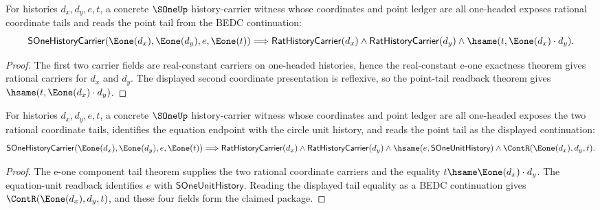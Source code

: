 \begin{theorem}
\label{thm:sone-history-carrier-e1-components-tail}
For histories $d_x,d_y,e,t$, a concrete $\SOneUp$ history-carrier witness whose
coordinates and point ledger are all one-headed exposes rational coordinate
tails and reads the point tail from the BEDC continuation:
$$
\mathsf{SOneHistoryCarrier}(\Eone(d_x),\Eone(d_y),e,\Eone(t))
\Longrightarrow
\mathsf{RatHistoryCarrier}(d_x)\land
\mathsf{RatHistoryCarrier}(d_y)\land
\hsame(t,\Eone(d_x)\cdot d_y).
$$
\end{theorem}
\begin{proof}
The first two carrier fields are real-constant carriers on one-headed
histories, hence the real-constant e-one exactness theorem gives rational
carriers for $d_x$ and $d_y$. The displayed second coordinate presentation is
reflexive, so the point-tail readback theorem gives
$\hsame(t,\Eone(d_x)\cdot d_y)$.
\end{proof}

\begin{theorem}
\label{thm:s1-history-carrier-e1-components-unit-tail-readback}
For histories $d_x,d_y,e,t$, a concrete $\SOneUp$ history-carrier witness whose
coordinates and point ledger are all one-headed exposes the two rational
coordinate tails, identifies the equation endpoint with the circle unit
history, and reads the point tail as the displayed continuation:
$$
\mathsf{SOneHistoryCarrier}(\Eone(d_x),\Eone(d_y),e,\Eone(t))
\Longrightarrow
\mathsf{RatHistoryCarrier}(d_x)\land
\mathsf{RatHistoryCarrier}(d_y)\land
\hsame(e,\mathsf{SOneUnitHistory})\land
\ContR(\Eone(d_x),d_y,t).
$$
\end{theorem}
\begin{proof}
The e-one component tail theorem supplies the two rational coordinate carriers
and the equality $t\hsame \Eone(d_x)\cdot d_y$. The equation-unit readback
identifies $e$ with $\mathsf{SOneUnitHistory}$. Reading the displayed tail
equality as a BEDC continuation gives $\ContR(\Eone(d_x),d_y,t)$, and these
four fields form the claimed package.
\end{proof}

